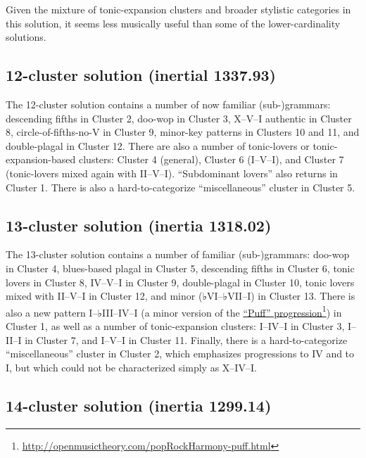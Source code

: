 Given the mixture of tonic-expansion clusters and broader stylistic categories in this solution, it seems less musically useful than some of the lower-cardinality solutions.

\subsection{12-cluster solution (inertial 1337.93)}
\label{12-clustersolutioninertial1337.93}

The 12-cluster solution contains a number of now familiar (sub-)grammars: descending fifths in Cluster 2, doo-wop in Cluster 3, X–V–I authentic in Cluster 8, circle-of-fifths-no-V in Cluster 9, minor-key patterns in Clusters 10 and 11, and double-plagal in Cluster 12. There are also a number of tonic-lovers or tonic-expansion-based clusters: Cluster 4 (general), Cluster 6 (I–V–I), and Cluster 7 (tonic-lovers mixed again with II–V–I). ``Subdominant lovers'' also returns in Cluster 1. There is also a hard-to-categorize ``miscellaneous'' cluster in Cluster 5.

\subsection{13-cluster solution (inertia 1318.02)}
\label{13-clustersolutioninertia1318.02}

The 13-cluster solution contains a number of familiar (sub-)grammars: doo-wop in Cluster 4, blues-based plagal in Cluster 5, descending fifths in Cluster 6, tonic lovers in Cluster 8, IV–V–I in Cluster 9, double-plagal in Cluster 10, tonic lovers mixed with II–V–I in Cluster 12, and minor (♭VI–♭VII–I) in Cluster 13. There is also a new pattern I–♭III–IV–I (a minor version of the \href{http://openmusictheory.com/popRockHarmony-puff.html}{``Puff'' progression}\footnote{\href{http://openmusictheory.com/popRockHarmony-puff.html}{http:/\slash openmusictheory.com\slash popRockHarmony-puff.html}}) in Cluster 1, as well as a number of tonic-expansion clusters: I–IV–I in Cluster 3, I–II–I in Cluster 7, and I–V–I in Cluster 11. Finally, there is a hard-to-categorize ``miscellaneous'' cluster in Cluster 2, which emphasizes progressions to IV and to I, but which could not be characterized simply as X–IV–I.

\subsection{14-cluster solution (inertia 1299.14)}
\label{14-clustersolutioninertia1299.14}

